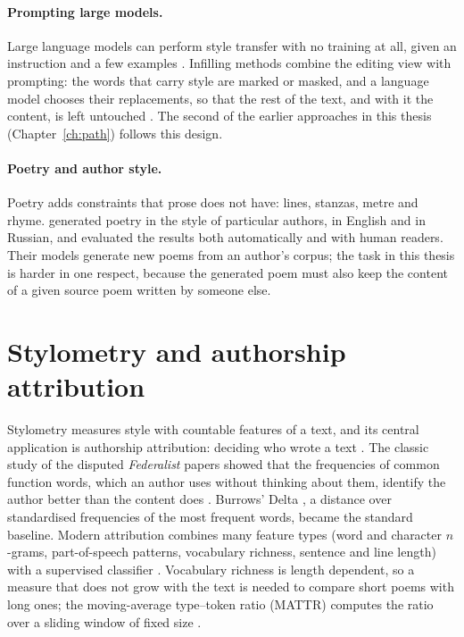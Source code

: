 \paragraph{Prompting large models.} Large language models can perform
style transfer with no training at all, given an instruction and a few
examples \citep{reif2022recipe}. Infilling methods combine the editing view
with prompting: the words that carry style are marked or masked, and a
language model chooses their replacements, so that the rest of the text,
and with it the content, is left untouched \citep{pegf}. The second of the
earlier approaches in this thesis (Chapter~\ref{ch:path}) follows this
design.

\paragraph{Poetry and author style.} Poetry adds constraints that prose
does not have: lines, stanzas, metre and rhyme. \citet{tikhonov2018guesswho}
generated poetry in the style of particular authors, in English and in
Russian, and evaluated the results both automatically and with human
readers. Their models generate new poems from an author's
corpus; the task in this thesis is harder in one respect, because the
generated poem must also keep the content of a given source poem written
by someone else.

\section{Stylometry and authorship attribution}

Stylometry measures style with countable features of a text, and its
central application is authorship attribution: deciding who wrote a text
\citep{stamatatos2009survey}. The classic study of the disputed
\emph{Federalist} papers showed that the frequencies of common function
words, which an author uses without thinking about them, identify the
author better than the content does \citep{mosteller1964}. Burrows' Delta
\citep{burrows2002delta}, a distance over standardised frequencies of the
most frequent words, became the standard baseline. Modern attribution
combines many feature types (word and character $n$-grams, part-of-speech
patterns, vocabulary richness, sentence and line length) with a supervised
classifier \citep{stamatatos2009survey}. Vocabulary richness is length
dependent, so a measure that does not grow with the text is needed to
compare short poems with long ones; the moving-average type--token ratio
(MATTR) computes the ratio over a sliding window of fixed size
\citep{covington2010mattr}.

